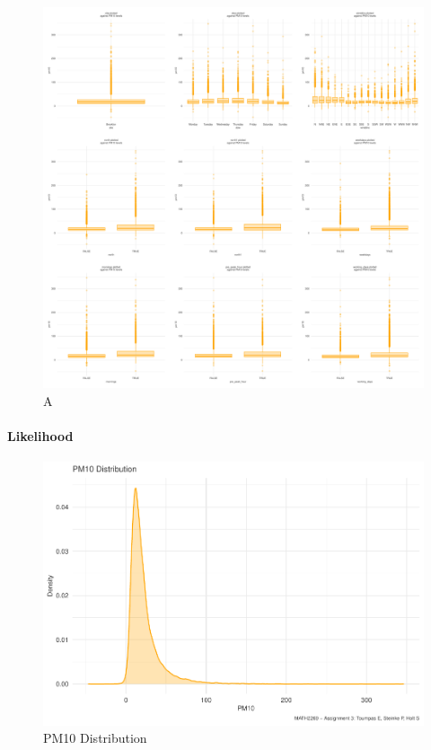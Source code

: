 \documentclass[12pt]{article}
\begin{document}
\begin{figure}
\centering
\includegraphics{MATH2269_final_project_files/figure-latex/A categorical univariate vs target class distribution-1.pdf}
\caption{A}
\end{figure}

\hypertarget{likelihood}{%
\paragraph{Likelihood}\label{likelihood}}

\begin{figure}
\centering
\includegraphics{MATH2269_final_project_files/figure-latex/unnamed-chunk-17-1.pdf}
\caption{PM10 Distribution}
\end{figure}
\end{document}
